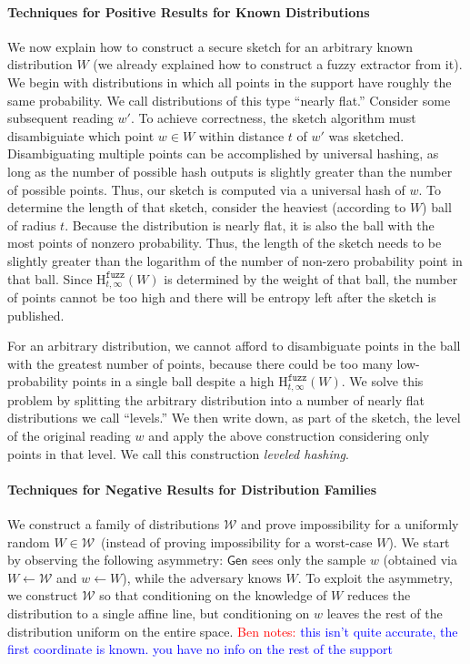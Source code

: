 \documentclass[11pt]{article}
\newcommand{\class}[1]{{\ensuremath{\mathsf{#1}}}}
\newcommand{\gen}{\ensuremath{\class{Gen}}\xspace}
\newcommand{\Hfuzz}{\mathrm{H}^{\mathtt{fuzz}}_{t,\infty}}
\newcommand{\authnote}[2]{{\textcolor{red}{\textsf{#1 notes: }\textcolor{blue}{ #2}}\marginpar{\textcolor{red}{\textbf{!!!!!}}}}}
\newcommand{\authnote}[2]{}
\newcommand{\bnote}[1]{{\authnote{Ben}{#1}}}
\begin{document}
\paragraph{Techniques for Positive Results for Known Distributions} We now explain how to construct a secure sketch for an arbitrary known distribution $W$ (we already explained how to construct a fuzzy extractor from it).  We begin with distributions in which all points in the support have roughly the same probability.  We call distributions of this type ``nearly flat.''  Consider some subsequent reading $w'$. To achieve correctness, the sketch algorithm must disambiguiate which point $w\in W$ within distance $t$ of $w'$ was sketched. Disambiguating multiple points can be accomplished by universal hashing, as long as the number of possible hash outputs is slightly greater than the number of possible points. Thus, our sketch is computed via a universal hash of $w$. To determine the length of that sketch, consider the heaviest (according to $W$) ball of radius $t$. Because the distribution is nearly flat, it is also the ball with the most points of nonzero probability. Thus, the length of the sketch needs to be slightly greater than the logarithm of the number of non-zero probability point in that ball. Since $\Hfuzz(W)$ is determined by the weight of that ball, the number of points cannot be too high and there will be entropy left after the sketch is published.

For an arbitrary distribution, we cannot afford to disambiguate points in the ball with the greatest number of points, because there could be too many low-probability points in a single ball despite a high $\Hfuzz(W)$.  We solve this problem by splitting the arbitrary distribution into a number of nearly flat distributions we call ``levels.''  We then write down, as part of the sketch, the level of the original reading $w$ and apply the above construction considering only points in that level.  We call this construction \emph{leveled hashing}.%

\paragraph{Techniques for Negative Results for Distribution Families}
We construct a family of distributions $\mathcal{W}$ and prove impossibility for a uniformly random $W\in \mathcal{W}$~(instead of proving impossibility for a worst-case $W$).
We start by observing the following asymmetry: $\gen$  sees only the sample $w$ (obtained via $W\leftarrow \mathcal{W}$ and $w\leftarrow W$), while
the adversary knows $W$.   To exploit the asymmetry, we construct $\mathcal{W}$ so that conditioning on the knowledge of $W$ reduces the distribution to a single affine line, but conditioning on $w$ leaves the rest of the distribution uniform on the entire space. \bnote{this isn't quite accurate, the first coordinate is known.  you have no info on the rest of the support}
\end{document}
